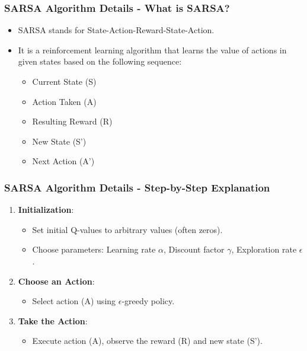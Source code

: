 \documentclass[aspectratio=169]{beamer}
\begin{document}
\begin{frame}[fragile]
    \frametitle{SARSA Algorithm Details - What is SARSA?}
    \begin{itemize}
        \item SARSA stands for State-Action-Reward-State-Action.
        \item It is a reinforcement learning algorithm that learns the value of actions in given states based on the following sequence:
        \begin{itemize}
            \item Current State (S)
            \item Action Taken (A)
            \item Resulting Reward (R)
            \item New State (S')
            \item Next Action (A')
        \end{itemize}
    \end{itemize}
\end{frame}

\begin{frame}[fragile]
    \frametitle{SARSA Algorithm Details - Step-by-Step Explanation}
    \begin{enumerate}
        \item \textbf{Initialization}:
            \begin{itemize}
                \item Set initial Q-values to arbitrary values (often zeros).
                \item Choose parameters: Learning rate $\alpha$, Discount factor $\gamma$, Exploration rate $\epsilon$.
            \end{itemize}
        \item \textbf{Choose an Action}: 
            \begin{itemize}
                \item Select action (A) using $\epsilon$-greedy policy.
            \end{itemize}
        \item \textbf{Take the Action}:
            \begin{itemize}
                \item Execute action (A), observe the reward (R) and new state (S').
            \end{itemize}
    \end{enumerate}
\end{frame}
\end{document}
